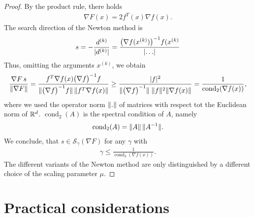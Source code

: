 \begin{proof}
  By the product rule, there holds
  \begin{gather*}
    \nabla F(x) = 2 f^T(x) \nabla f(x).
  \end{gather*}
  The search direction of the Newton method is
  \begin{gather*}
    s = -\frac{d^{(k)}}{\lvert d^{(k)}\rvert}
    = \frac{\bigl(\nabla f(x^{(k)})\bigr)^{-1}f(x^{(k)}}{\lvert\dots\rvert}
  \end{gather*}
  Thus, omitting the arguments $x^{(k)}$, we obtain
  \begin{gather*}
    \frac{\nabla F\, s}{\norm{\nabla F}}
    = \frac{f^T \nabla f(x)\bigl(\nabla f\bigr)^{-1} f}%
    {\norm{\bigl(\nabla f\bigr)^{-1} f}\,\norm{f^T \nabla f(x)}}
    \ge \frac{\abs{f}^2}{\norm{\bigl(\nabla f\bigr)^{-1}}\;
      \norm{f}^2 \norm{\nabla f(x)} }
    = \frac1{\operatorname{cond}_2 (\nabla f(x))},
  \end{gather*}
  where we used the operator norm $\lVert.\rVert$ of matrices with respect
  tot the Euclidean norm of $\mathbb R^d$. $\operatorname{cond}_2(A)$ is the
  spectral condition of $A$, namely
  \begin{gather*}
    \operatorname{cond}_2(A) = \lVert A\rVert \, \lVert A^{-1}\rVert.
  \end{gather*}
  We conclude, that $s\in \mathcal S_\gamma(\nabla F)$ for any
  $\gamma$ with
  \begin{gather*}
    \gamma \le \frac1{\operatorname{cond}_2 (\nabla f(x))}.
  \end{gather*}
  The different variants of the Newton method are only distinguished by
  a different choice of the scaling parameter $\mu$.
\end{proof}



\section{Practical considerations}

